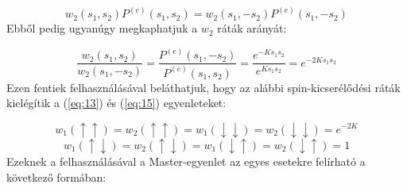 \begin{equation} \label{eq:14}
    w_{2} \left( s_{1}, s_{2} \right) P^{\left( e \right)} \left( s_{1}, s_{2} \right)
    =
    w_{2} \left( s_{1}, - s_{2} \right) P^{\left( e \right)} \left( s_{1}, - s_{2} \right)
\end{equation}
Ebből pedig ugyanúgy megkaphatjuk a $w_{2}$ ráták arányát:

\begin{equation} \label{eq:15}
    \frac{w_{2} \left( s_{1}, s_{2} \right)}{w_{2} \left( s_{1}, - s_{2} \right)}
    =
    \frac{P^{\left( e \right)} \left( s_{1}, - s_{2} \right)}{P^{\left( e \right)} \left( s_{1}, s_{2} \right)}
    =
    \frac{e^{- K s_{1} s_{2}}}{e^{K s_{1} s_{2}}}
    =
    e^{- 2 K s_{1} s_{2}}
\end{equation}
Ezen fentiek felhasználásával beláthatjuk, hogy az alábbi spin-kicserélődési ráták kielégítik a (\ref{eq:13}) és (\ref{eq:15}) egyenleteket:

\begin{equation} \label{eq:16}
    w_{1} \left( \uparrow \uparrow \right)
    =
    w_{2} \left( \uparrow \uparrow \right)
    =
    w_{1} \left( \downarrow \downarrow \right)
    =
    w_{2} \left( \downarrow \downarrow \right)
    =
    e^{-2 K}
\end{equation}
\begin{equation} \label{eq:17}
    w_{1} \left( \uparrow \downarrow \right)
    =
    w_{2} \left( \uparrow \downarrow \right)
    =
    w_{1} \left( \downarrow \uparrow \right)
    =
    w_{2} \left( \downarrow \uparrow \right)
    =
    1
\end{equation}
Ezeknek a felhasználásával a Master-egyenlet az egyes esetekre felírható a következő formában:

